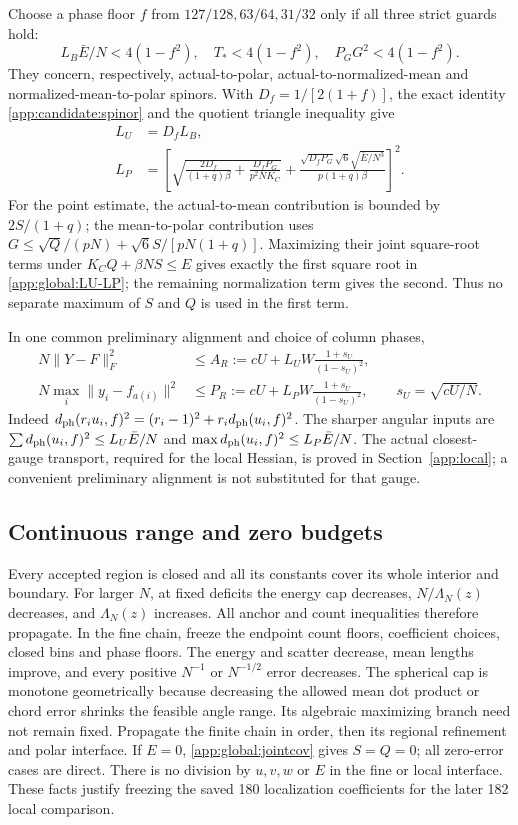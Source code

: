 Choose a phase floor $f$ from $127/128,63/64,31/32$ only if all three
strict guards hold:
\begin{equation}\label{app:global:phaseguards}
 L_B\bar E/N<4(1-f^2),\quad T_*<4(1-f^2),\quad
 P_GG^2<4(1-f^2).
\end{equation}
They concern, respectively, actual-to-polar, actual-to-normalized-mean
and normalized-mean-to-polar spinors. With $D_f=1/[2(1+f)]$, the
exact identity \eqref{app:candidate:spinor} and the quotient triangle
inequality give
\begin{align}\label{app:global:LU-LP}
 L_U&=D_fL_B,\\
 L_P&=\left[
 \sqrt{\frac{2D_f}{(1+q)\beta}+\frac{D_fP_G}{p^2NK_C}}
 +\frac{\sqrt{D_fP_G}\sqrt6\sqrt{\bar E/N^3}}
 {p(1+q)\beta}\right]^2.\nonumber
\end{align}
For the point estimate, the actual-to-mean contribution is bounded by
$2S/(1+q)$; the mean-to-polar contribution uses
$G\le\sqrt Q/(pN)+\sqrt6S/[pN(1+q)]$.
Maximizing their joint square-root terms under
$K_CQ+\beta NS\le E$ gives exactly the first square root in
\eqref{app:global:LU-LP}; the remaining normalization term gives the
second. Thus no separate maximum of $S$ and $Q$ is used in the first term.

In one common preliminary alignment and choice of column phases,
\begin{align}\label{app:global:physical-inputs}
 N\|Y-F\|_F^2&\le A_R:=cU+L_UW\frac{1+s_U}{(1-s_U)^2},\\
 N\max_i\|y_i-f_{a(i)}\|^2&\le P_R:=cU+L_PW\frac{1+s_U}{(1-s_U)^2},
 \qquad s_U=\sqrt{cU/N}.\nonumber
\end{align}
Indeed $d_{\rm ph}(r_iu_i,f)^2=(r_i-1)^2+r_id_{\rm ph}(u_i,f)^2$.
The sharper angular inputs are
$\sum d_{\rm ph}(u_i,f)^2\le L_U\bar E/N$ and
$\max d_{\rm ph}(u_i,f)^2\le L_P\bar E/N$.
The actual closest-gauge transport, required for the local Hessian,
is proved in Section~\ref{app:local}; a convenient preliminary
alignment is not substituted for that gauge.

\subsection{Continuous range and zero budgets}
Every accepted region is closed and all its constants cover its whole
interior and boundary. For larger $N$, at fixed deficits the energy
cap decreases, $N/\Lambda_N(z)$ decreases, and $\Lambda_N(z)$ increases.
All anchor and count inequalities therefore propagate. In the fine
chain, freeze the endpoint count floors, coefficient choices, closed
bins and phase floors. The energy and scatter decrease, mean lengths
improve, and every positive $N^{-1}$ or $N^{-1/2}$ error decreases.
The spherical cap is monotone geometrically because decreasing the
allowed mean dot product or chord error shrinks the feasible angle
range. Its algebraic maximizing branch need not remain fixed.
Propagate the finite chain in order, then its regional refinement and
polar interface. If $E=0$, \eqref{app:global:jointcov} gives $S=Q=0$;
all zero-error cases are direct. There is no division by $u,v,w$ or $E$
in the fine or local interface. These facts justify freezing the saved
180 localization coefficients for the later 182 local comparison.

